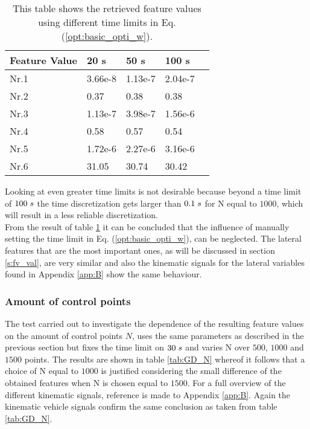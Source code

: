 \begin{table}[h!]
	\centering
	\begin{tabular}{@{}llllr@{}} \toprule
		\textbf{Feature Value}    & 20 s  & 50 s      & 100 s\\ \midrule
		Nr.1       & 3.66e-8     & 1.13e-7   & 2.04e-7\\
		Nr.2       & 0.37        & 0.38      & 0.38\\
		Nr.3       & 1.13e-7     & 3.98e-7   & 1.56e-6 \\
		Nr.4       & 0.58        & 0.57      & 0.54\\
		Nr.5       & 1.72e-6     & 2.27e-6   & 3.16e-6\\
		Nr.6       & 31.05       & 30.74     & 30.42\\ \bottomrule
	\end{tabular}
	\caption{This table shows the retrieved feature values using different time limits in Eq. (\ref{opt:basic_opti_w}).}
	\label{tab:GD_time_limit}
\end{table}
Looking at even greater time limits is not desirable because beyond a time limit of $100 \hspace{1mm}s$ the time discretization gets larger than $0.1\hspace{1mm}s$ for N equal to $1000$, which will result in a less reliable discretization.\\

From the result of table \ref{tab:GD_time_limit} it can be concluded that the influence of manually setting the time limit in Eq. (\ref{opt:basic_opti_w}), can be neglected. The lateral features that are the most important ones, as will be discussed in section \ref{s:fv_val}, are very similar and also the kinematic signals for the lateral variables found in Appendix \ref{app:B} show the same behaviour.

\subsubsection{Amount of control points}
The test carried out to investigate the dependence of the resulting feature values on the amount of control points $N$, uses the same parameters as described in the previous section but fixes the time limit on $30\hspace{1mm}s$ and varies N over $500$, $1000$ and $1500$ points. The results are shown in table \ref{tab:GD_N} whereof it follows that a choice of N equal to $1000$ is justified considering the small difference of the obtained features when N is chosen equal to $1500$. For a full overview of the different kinematic signals, reference is made to Appendix \ref{app:B}. Again the kinematic vehicle signals confirm the same conclusion as taken from table \ref{tab:GD_N}.

